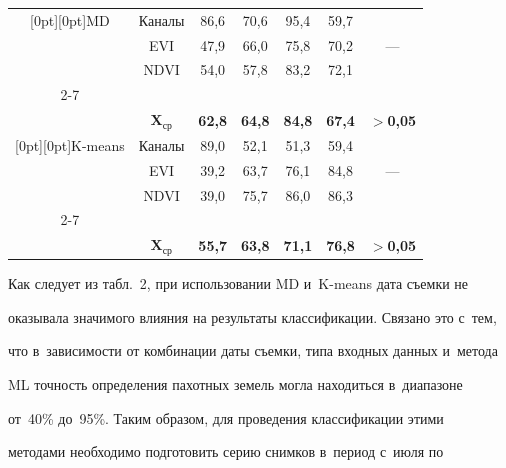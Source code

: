 \begin{table}
\begin{center}
\begin{tabular}{|c|c|c|c|c|c|c|}
\hline

\multicolumn{1}{|c|}{\raisebox{-18pt}[0pt][0pt]{MD}}&Каналы&86,6&70,6&95,4&59,7&\\

&EVI&47,9&66,0&75,8&70,2&---\\

&NDVI&54,0&57,8&83,2&72,1&\\

\cline{2-7}

&&&&&&\\[-9pt]

&$\bm{X}_{\mathbf{ср}}$&\textbf{62,8}&\textbf{64,8}&\textbf{84,8}&\textbf{67,4}&$>$\textbf{0,05}\\

\hline

\multicolumn{1}{|c|}{\raisebox{-18pt}[0pt][0pt]{K-means}}&Каналы&89,0&52,1&51,3&59,4&\\

&EVI&39,2&63,7&76,1&84,8&---\\

&NDVI&39,0&75,7&86,0&86,3&\\

\cline{2-7}

&&&&&&\\[-9pt]

&$\bm{X}_{\mathbf{ср}}$&\textbf{55,7}&\textbf{63,8}&\textbf{71,1}&\textbf{76,8}&$>$\textbf{0,05}\\

\hline

\end{tabular}

\end{center}

\end{table}





  

  Как следует из табл.~2, при использовании MD и~K-means дата съемки не 

оказывала значимого влияния на результаты классификации. Связано это с~тем, 

что в~зависимости от комбинации даты съемки, типа входных данных и~метода 

ML точ\-ность определения пахотных земель могла находиться в~диапазоне 

от~40\% до~95\%. Таким образом, для проведения классификации этими 

методами необходимо подготовить серию снимков в~период с~июля по 

